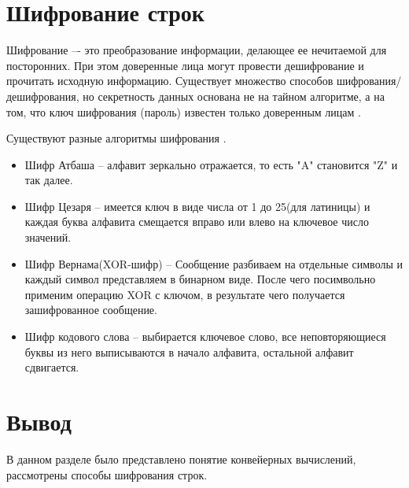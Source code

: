 \section{Шифрование строк}
\label{sec:crypt}
Шифрование –- это преобразование информации, делающее ее нечитаемой для посторонних. При этом  доверенные лица могут провести дешифрование и прочитать исходную информацию. Существует множество способов шифрования/дешифрования, но секретность данных основана не на тайном алгоритме, а на том, что ключ шифрования (пароль) известен только доверенным лицам \cite{crypting}.
\par Существуют разные алгоритмы шифрования \cite{cr_algs}.
\begin{itemize}
	\item Шифр Атбаша -- алфавит зеркально отражается, то есть "A" становится "Z" и так далее.
	\item Шифр Цезаря -- имеется ключ в виде числа от 1 до 25(для латиницы) и каждая буква алфавита смещается вправо или влево на ключевое число значений.
	\item Шифр Вернама(XOR-шифр) -- Сообщение разбиваем на отдельные символы и каждый символ представляем в бинарном виде. После чего посимвольно применим операцию XOR с ключом, в результате чего получается зашифрованное сообщение.
	\item Шифр кодового слова -- выбирается ключевое слово, все неповторяющиеся буквы из него выписываются в начало алфавита, остальной алфавит сдвигается.
\end{itemize}

\section{Вывод}
\label{sec:res}
В данном разделе было представлено понятие конвейерных вычислений, рассмотрены способы шифрования строк.